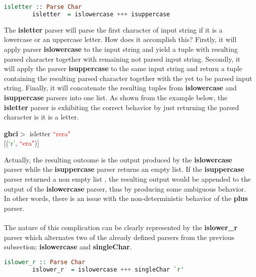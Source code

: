 \documentclass[a4paper, onecolumn]{article}
\begin{document}
    \begin{tcolorbox}
    \begin{lstlisting}[language=Haskell] 
        isletter :: Parse Char
        isletter  = islowercase +++ isuppercase
    \end{lstlisting}
    \end{tcolorbox}
    
    \noindent The \textbf{isletter} parser will parse the first character of input string if it is a lowercase or an uppercase letter. How does it accomplish this? Firstly, it will apply parser \textbf{islowercase} to the input string and yield a tuple with resulting parsed character together with remaining not parsed input string. Secondly, it will apply the parser \textbf{isuppercase} to the same input string and return a tuple containing the resulting  parsed character together with the yet to be parsed input string. Finally, it will concatenate the resulting tuples from \textbf{islowercase} and \textbf{isuppercase} parsers into one list. As shown from the example below, the \textbf{isletter} parser is exhibiting the correct behavior by just returning the parsed character is it is a letter.
    
    \begin{center}
            \textbf{ghci$>$} isletter \textcolor{red}{``rera"} \\
            $\big[$(\textcolor{green}{`r'}, \textcolor{red}{``era"})$\big]$
    \end{center}
    
    \noindent Actually, the resulting outcome is the output produced by the \textbf{islowercase} parser while the \textbf{isuppercase} parser returns an empty list. If the \textbf{isuppercase} parser returned a non empty list , the resulting output would be appended to the output of the \textbf{islowercase} parser, thus by producing some ambiguous behavior. In other words, there is an issue with the non-deterministic behavior of the \textbf{plus} parser. \\ \\
    The nature of this complication can be clearly represented by the \textbf{islower\_r} parser which alternates two of the already defined parsers from the previous subsection: \textbf{islowercase} and \textbf{singleChar}. 
    
    \begin{tcolorbox}
    \begin{lstlisting}[language=Haskell] 
        islower_r :: Parse Char
        islower_r  = islowercase +++ singleChar `r'
    \end{lstlisting}
    \end{tcolorbox}
    
\end{document}
